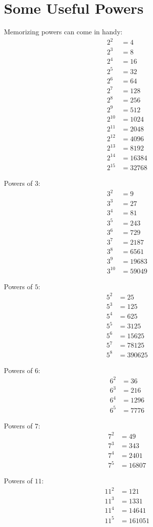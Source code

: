 
\section*{Some Useful Powers}
Memorizing powers can come in handy:
\begin{align*}
2^2    & = 4\\
2^3    & = 8\\
2^4    & = 16\\
2^5    & = 32\\
2^6    & = 64\\
2^7    & = 128\\
2^8    & = 256\\
2^9    & = 512\\
2^{10} & = 1024\\
2^{11} & = 2048\\
2^{12} & = 4096\\
2^{13} & = 8192\\
2^{14} & = 16384\\
2^{15} & = 32768
\end{align*}

Powers of $3$:
\begin{align*}
3^2    & = 9\\
3^3    & = 27\\
3^4    & = 81\\
3^5    & = 243\\
3^6    & = 729\\
3^7    & = 2187\\
3^8    & = 6561\\
3^9    & = 19683\\
3^{10} & = 59049
\end{align*}

Powers of $5$:
\begin{align*}
5^2    & = 25\\
5^3    & = 125\\
5^4    & = 625\\
5^5    & = 3125\\
5^6    & = 15625\\
5^7    & = 78125\\
5^8    & = 390625
\end{align*}

Powers of $6$:
\begin{align*}
6^2    & = 36\\
6^3    & = 216\\
6^4    & = 1296\\
6^5    & = 7776
\end{align*}

Powers of $7$:
\begin{align*}
7^2    & = 49\\
7^3    & = 343\\
7^4    & = 2401\\
7^5    & = 16807
\end{align*}

Powers of $11$:
\begin{align*}
11^2    & = 121\\
11^3    & = 1331\\
11^4    & = 14641\\
11^5    & = 161051
\end{align*}